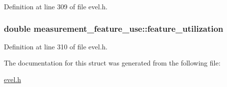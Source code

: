 Definition at line 309 of file evel.\+h.

\hypertarget{structmeasurement__feature__use_a67c1772a8a83e0e386a3ce5dc783b8ee}{}
\subsubsection[{feature\+\_\+utilization}]{\setlength{\rightskip}{0pt plus 5cm}double measurement\+\_\+feature\+\_\+use\+::feature\+\_\+utilization}\label{structmeasurement__feature__use_a67c1772a8a83e0e386a3ce5dc783b8ee}


Definition at line 310 of file evel.\+h.



The documentation for this struct was generated from the following file\+:\begin{DoxyCompactItemize}
\item 
\hyperlink{evel_8h}{evel.\+h}\end{DoxyCompactItemize}
